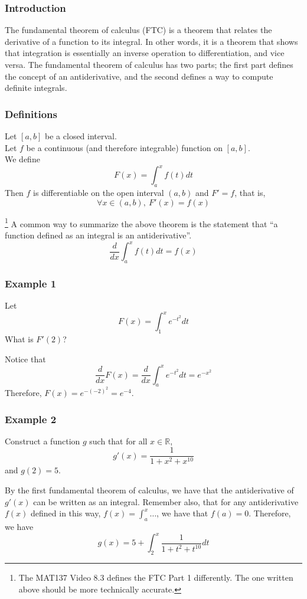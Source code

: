 \documentclass[10pt]{article}
\def\R{{\mathbb R}}
\newenvironment{theorem}[1][]{\begin{tcolorbox}[colframe=_blue,colback=_blue2,title=Theorem. \ifthenelse{\isempty{#1}}{}{(#1)}
]}{\end{tcolorbox}}
\newenvironment{solution}{\begin{tcolorbox}[colframe=_grey,colback=white,arc=0pt,outer arc=0pt]}{\end{tcolorbox}}
\begin{document}
\subsubsection{Introduction}
The fundamental theorem of calculus (FTC) is a theorem that relates the derivative of a function to its integral. In other words, it is a theorem that shows that integration is essentially an inverse operation to differentiation, and vice versa. The fundamental theorem of calculus has two parts; the first part defines the concept of an antiderivative, and the second defines a way to compute definite integrals.
\subsubsection{Definitions}
\begin{theorem}[Fundamental Theorem of Calculus - Part 1]
    Let $[a,b]$ be a closed interval. \\
    Let $f$ be a continuous (and therefore integrable) function on $[a,b]$. \\
    We define
    $$
        F(x)=\int_a^xf(t)dt
    $$
    Then $f$ is differentiable on the open interval $(a,b)$ and $F'=f$, that is,
    $$
        \forall x\in (a,b),~F'(x)=f(x)
    $$
\end{theorem}\footnote{The MAT137 Video 8.3 defines the FTC Part 1 differently. The one written above should be more technically accurate.}
A common way to summarize the above theorem is the statement that ``a function defined as an integral is an antiderivative''.
$$
    \frac{d}{dx}\int_a^x f(t)dt=f(x)
$$
\subsubsection{Example 1}
Let
$$
    F(x)=\int_1^x e^{-t^2}dt
$$
What is $F'(2)$?
\begin{solution}
    Notice that
    $$
        \frac{d}{dx}F(x)=\frac{d}{dx}\int_a^xe^{-t^2}dt=e^{-x^2}
    $$
    Therefore, $F(x)=e^{-(-2)^2}=e^{-4}$.
\end{solution}
\subsubsection{Example 2}
Construct a function $g$ such that for all $x\in\R$,
$$
    g'(x)=\frac{1}{1+x^2+x^{10}}
$$
and $g(2)=5$.
\begin{solution}
    By the first fundamental theorem of calculus, we have that the antiderivative of $g'(x)$ can be written as an integral. Remember also, that for any antiderivative $f(x)$ defined in this way, $f(x)=\displaystyle\int_a^x\dots$, we have that $f(a)=0$. Therefore, we have
    $$
        g(x)=5+\int_2^x\frac{1}{1+t^2+t^{10}}dt
    $$
\end{solution}
\newpage
\end{document}
